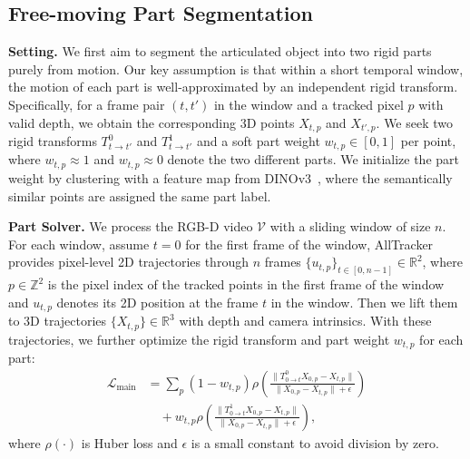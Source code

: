 \subsection{Free-moving Part Segmentation}
\label{sec:seg}
\noindent\textbf{Setting.} We first aim to segment the articulated object into two rigid parts purely from motion. Our key assumption is that within a short temporal window, the motion of each part is well-approximated by an independent rigid transform. Specifically, for a frame pair $(t, t')$ in the window and a tracked pixel $p$ with valid depth, 
we obtain the corresponding 3D points $X_{t,p}$ and $X_{t',p}$. 
We seek two rigid transforms $T^0_{t\to t'}$ 
and $T^1_{t\to t'}$ and a soft part weight $w_{t,p}\in[0,1]$ per point, 
where $w_{t,p}\!\approx\!1$ and $w_{t,p}\!\approx\!0$ denote the two different parts. We initialize the part weight by clustering with a feature map from DINOv3~\cite{simeoni2025dinov3}, where the semantically similar points are assigned the same part label.

\noindent\textbf{Part Solver.} We process the RGB-D video $\mathcal{V}$ with a sliding window of size $n$. 
For each window, assume $t=0$ for the first frame of the window, AllTracker~\cite{alltracker} provides pixel-level 2D trajectories through $n$ frames
$\{u_{t,p}\}_{t\in[0,n-1]}\in \mathbb{R}^2$, 
where $p\in\mathbb{Z}^2$ is the pixel index of the tracked points in the first frame of the window
and $u_{t,p}$ denotes its 2D position at the frame $t$ in the window.
Then we lift them to 3D trajectories $\{X_{t,p}\}\in \mathbb{R}^3$ with depth and camera intrinsics. 
With these trajectories, we further optimize the rigid transform and part weight $w_{t,p}$ for each part: 
\[
\begin{aligned}
\mathcal{L}_{\mathrm{main}} &= \sum_{p} (1-w_{t,p})\rho\left(\frac{\big\|T^0_{0\to t}X_{0,p}-X_{t,p}\big\|}{\big\|X_{0,p}-X_{t,p}\big\|+\epsilon}\right) \\
&\quad+ w_{t,p}\rho\left(\frac{\big\|T^1_{0\to t}X_{0,p}-X_{t,p}\big\|}{\big\|X_{0,p}-X_{t,p}\big\|+\epsilon}\right),
\end{aligned}
\]
where $\rho(\cdot)$ is Huber loss and $\epsilon$ is a small constant to avoid division by zero.

